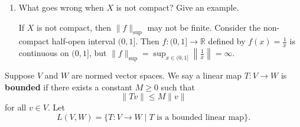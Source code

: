 \documentclass[11pt,oneside,english]{amsart}
\theoremstyle{definition}
\newcommand{\MB}[1]{\mathbb{#1}}
\begin{document}
\begin{enumerate}
\begin{enumerate}
\begin{proof}
Therefore, $f_n\rightarrow f$ in the metric $d$ so $C(X,V)$ is a Banach space by definition.
\end{proof}

\item What goes wrong when $X$ is not compact? Give an example.

If $X$ is not compact, then $\|f\|_{\sup}$ may not be finite. Consider the non-compact half-open interval $(0,1]$. Then $f:(0,1]\rightarrow \MB{R}$ defined by $f(x)=\frac{1}{x}$ is continuous on $(0,1]$, but $\|f\|_{\sup}=\sup_{x\in(0,1]}\left\|\frac{1}{x}\right\|=\infty$.
\end{enumerate}
\end{enumerate}


Suppose $V$ and $W$ are normed vector spaces.  We say a linear map $T:V\rightarrow W$ is \textbf{bounded} if there exists a constant $M \geq 0$ such that
\[       \|Tv\| \le M \|v\| \]
for all $v \in V$.   Let 
\[       L(V,W) = \{T: V\rightarrow W \mid T\text{ is a bounded linear map} \} .\]
\end{document}
